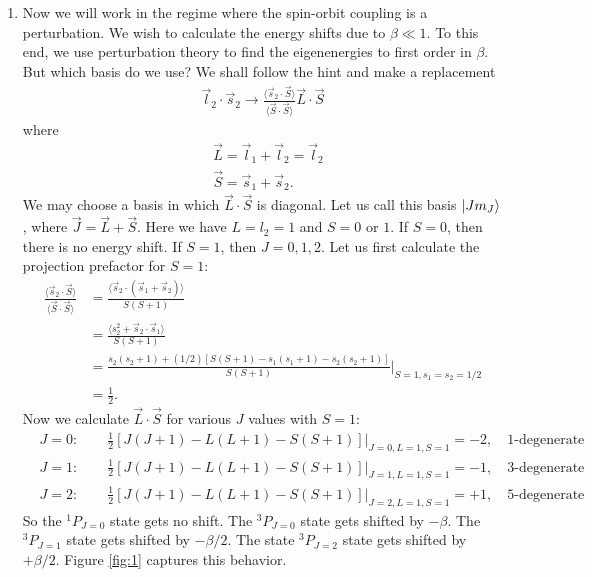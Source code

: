 \documentclass{article}
\theoremstyle{definition}
\newcommand{\be}{\beta}
\newcommand{\f}[2]{\frac{#1}{#2}}
\begin{document}
\begin{enumerate}[label=(\alph*)]
	
	\item Now we will work in the regime where the spin-orbit coupling is a perturbation.  We wish to calculate the energy shifts due to $\be \ll 1$. To this end, we use perturbation theory to find the eigenenergies to first order in $\be$. But which basis do we use? We shall follow the hint and make a replacement 
	\begin{align*}
	\vec{l}_2 \cdot \vec{s}_2 \to \f{\langle \vec{s}_2 \cdot \vec{S}\rangle}{\langle \vec{S}\cdot \vec{S}\rangle} \vec{L} \cdot \vec{S}
	\end{align*}
	where 
	\begin{align*}
	&\vec{L} = \vec{l}_1 + \vec{l}_2 = \vec{l}_2\\
	&\vec{S} = \vec{s}_1 + \vec{s}_2.
	\end{align*}
	We may choose a basis in which $\vec{L}\cdot \vec{S}$ is diagonal. Let us call this basis $\ket{J m_J}$, where $\vec{J} = \vec{L} + \vec{S}$. Here we have $L=l_2 = 1$ and $S=0$ or $1$. If $S=0$, then there is no energy shift. If $S=1$, then $J=0,1,2$. Let us first calculate the projection prefactor for $S=1$:
	\begin{align*}
	\f{\langle \vec{s}_2 \cdot \vec{S}\rangle}{\langle \vec{S}\cdot \vec{S}\rangle} 
	&= \f{\langle \vec{s}_2 \cdot (\vec{s}_1 + \vec{s}_2)\rangle }{S(S+1)}  \\
	&= \f{\langle s_2^2 + \vec{s}_2\cdot \vec{s}_1  \rangle }{S(S+1)}  \\
	&= \f{s_2(s_2+1) +(1/2)[S(S+1) - s_1(s_1+1) - s_2(s_2+1)]}{S(S+1)}\bigg\vert_{S=1,s_1=s_2 =1/2}\\
	&= \f{1}{2}.
	\end{align*}
	Now we calculate $\vec{L}\cdot \vec{S}$ for various $J$ values with $S=1$:
	\begin{align*}
	&J=0: \quad\quad \f{1}{2}[J(J+1)-L(L+1)-S(S+1)]\bigg\vert_{J=0,L=1,S=1} =  -2, \quad \text{1-degenerate} \\
	&J=1: \quad\quad \f{1}{2}[J(J+1)-L(L+1)-S(S+1)]\bigg\vert_{J=1,L=1,S=1} =  -1,\quad \text{3-degenerate} \\
	&J=2: \quad\quad \f{1}{2}[J(J+1)-L(L+1)-S(S+1)]\bigg\vert_{J=2,L=1,S=1} =  +1, \quad \text{5-degenerate}
	\end{align*}
	So the $^1P_{J=0}$ state gets no shift. The $^3P_{J=0}$ state gets shifted by $-\be$. The $^3 P_{J=1}$ state gets shifted by $-\be/2$. The state $^3 P_{J=2}$ state gets shifted by $+\be/2$. Figure \ref{fig:1} captures this behavior. 
	
	
	

\end{enumerate}
\end{document}
